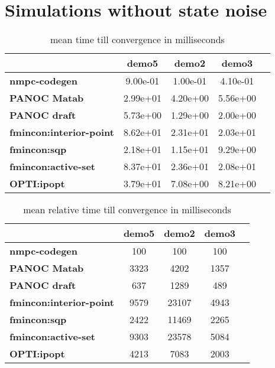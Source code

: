 \section{Simulations without state noise}
\label{appendix:benchmarks trailer without noise}

\begin{table}[H]
	\centering
	\begin{tabular}{|l|c|c|c|c|}
		\hline
		&\textbf{demo5}&\textbf{demo2}&\textbf{demo3}\\\hline
		\textbf{nmpc-codegen}&9.00e-01&1.00e-01&4.10e-01\\\hline
		\textbf{PANOC Matab}&2.99e+01&4.20e+00&5.56e+00\\\hline
		\textbf{PANOC draft}&5.73e+00&1.29e+00&2.00e+00\\\hline
		\textbf{fmincon:interior-point}&8.62e+01&2.31e+01&2.03e+01\\\hline
		\textbf{fmincon:sqp}&2.18e+01&1.15e+01&9.29e+00\\\hline
		\textbf{fmincon:active-set}&8.37e+01&2.36e+01&2.08e+01\\\hline
		\textbf{OPTI:ipopt}&3.79e+01&7.08e+00&8.21e+00\\\hline
	\end{tabular}
	\caption{mean time till convergence in milliseconds}
	\label{tbl:mean time till convergence}
\end{table}

\begin{table}[H]
	\centering
	\begin{tabular}{|l|c|c|c|c|}
		\hline
		&\textbf{demo5}&\textbf{demo2}&\textbf{demo3}\\\hline
		\textbf{nmpc-codegen}&100&100&100\\\hline
		\textbf{PANOC Matab}&3323&4202&1357\\\hline
		\textbf{PANOC draft}&637&1289&489\\\hline
		\textbf{fmincon:interior-point}&9579&23107&4943\\\hline
		\textbf{fmincon:sqp}&2422&11469&2265\\\hline
		\textbf{fmincon:active-set}&9303&23578&5084\\\hline
		\textbf{OPTI:ipopt}&4213&7083&2003\\\hline
	\end{tabular}
	\caption{mean relative time till convergence in milliseconds}
	\label{tbl:mean relative time till convergence}
\end{table}

